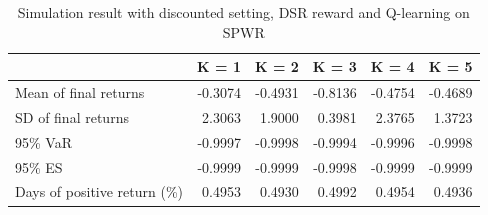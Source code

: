 \documentclass{article}
\begin{document}
\begin{table}[H]
\centering
\begin{tabular}{|l|r|r|r|r|r|} 
\hline
                             & \multicolumn{1}{l|}{K = 1} & \multicolumn{1}{l|}{K = 2} & \multicolumn{1}{l|}{K = 3} & \multicolumn{1}{l|}{K = 4} & \multicolumn{1}{l|}{K = 5}  \\ 
\hline
Mean of final returns        & -0.3074                    & -0.4931                    & -0.8136                    & -0.4754                    & -0.4689                     \\ 
\hline
SD of final returns          & 2.3063                     & 1.9000                     & 0.3981                     & 2.3765                     & 1.3723                      \\ 
\hline
95\% VaR                     & -0.9997                    & -0.9998                    & -0.9994                    & -0.9996                    & -0.9998                     \\ 
\hline
95\% ES                      & -0.9999                    & -0.9999                    & -0.9998                    & -0.9999                    & -0.9999                     \\ 
\hline
Days of positive return (\%) & 0.4953                     & 0.4930                     & 0.4992                     & 0.4954                     & 0.4936                      \\
\hline
\end{tabular}
\caption{Simulation result with discounted setting, DSR reward and Q-learning on SPWR}
\label{table14}
\end{table}
\end{document}
